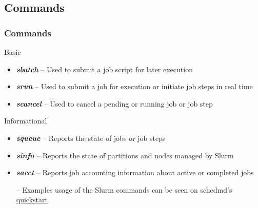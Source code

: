 \subsection{Commands}
\begin{frame}
\frametitle{Commands}
  \begin{block}{Basic}
    \begin{itemize}
    \item \emph{\textbf{sbatch}} -- Used to submit a job script for later execution
    \item \emph{\textbf{srun}} --  Used to submit a job for execution or initiate job steps in real time
    \item \emph{\textbf{scancel}} -- Used to cancel a pending or running job or job step
    \end{itemize}
  \end{block}
  \begin{block}{Informational}
    \begin{itemize}
    \item \emph{\textbf{squeue}} -- Reports the state of jobs or job steps
    \item \emph{\textbf{sinfo}} -- Reports the state of partitions and nodes managed by Slurm
    \item \emph{\textbf{sacct}} -- Reports job accounting information about active or completed jobs
    \end{itemize}
  \end{block}
  
  \begin{itemize}\footnotesize
  \item[--] Examples usage of the Slurm commands can be seen on schedmd's \href{http://slurm.schedmd.com/quickstart.html}{quickstart}
  \end{itemize}
\end{frame}


